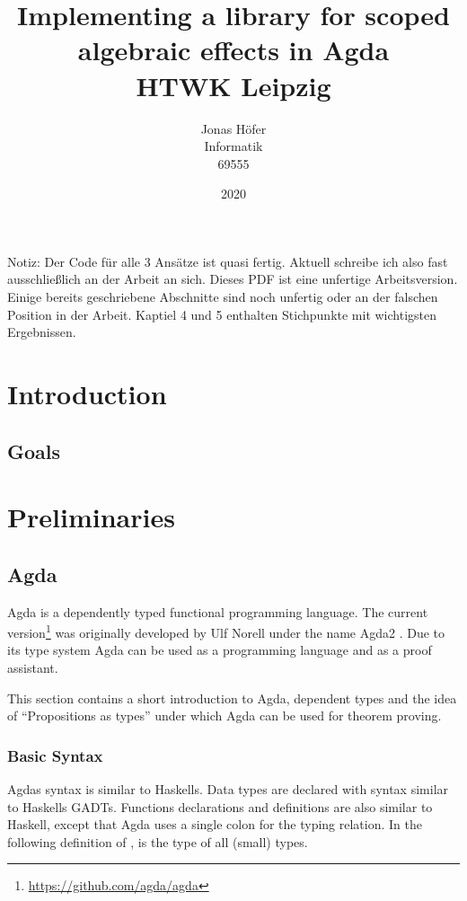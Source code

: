 \documentclass[10pt,a4paper,twoside]{report}
\title{
  {\huge\textbf{Implementing a library for scoped algebraic effects in Agda}}\\
  {\large HTWK Leipzig}
}
\author{
  {Jonas Höfer}\\
  {Informatik}\\
  {69555}
}
\date{2020}
\begin{document}
Notiz: Der Code für alle 3 Ansätze ist quasi fertig.
Aktuell schreibe ich also fast ausschließlich an der Arbeit an sich.
Dieses PDF ist eine unfertige Arbeitsversion.
Einige bereits geschriebene Abschnitte sind noch unfertig oder an der falschen
Position in der Arbeit.
Kaptiel 4 und 5 enthalten Stichpunkte mit wichtigsten Ergebnissen.

\maketitle
\begin{abstract}
\end{abstract}

\tableofcontents

\chapter{Introduction}
\section{Goals}
\chapter{Preliminaries}
\section{Agda}

Agda is a dependently typed functional programming language.
The current version\footnote{\url{https://github.com/agda/agda}} was originally
developed by Ulf Norell under the name Agda2 \cite{norell:thesis}.
Due to its type system Agda can be used as a programming language and as a proof
assistant.

This section contains a short introduction to Agda, dependent types and the idea
of ``Propositions as types'' under which Agda can be used for theorem proving.

\subsection{Basic Syntax}

Agdas syntax is similar to Haskells.
Data types are declared with syntax similar to Haskells GADTs.
Functions declarations and definitions are also similar to Haskell, except that
Agda uses a single colon for the typing relation.
In the following definition of ,  is the type
of all (small) types.
\end{document}
